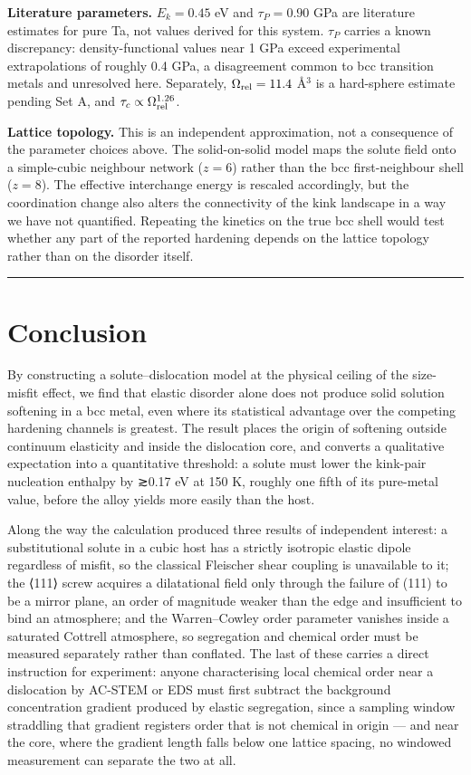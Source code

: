 \textbf{Literature parameters.} \(E_k = 0.45\) eV and \(\tau_P = 0.90\) GPa are literature estimates for pure Ta, not values derived for this system. \(\tau_P\) carries a known discrepancy: density-functional values near 1 GPa exceed experimental extrapolations of roughly 0.4 GPa, a disagreement common to bcc transition metals and unresolved here. Separately, \(\Omega_{\rm rel} = 11.4\) \AA\(^3\) is a hard-sphere estimate pending Set A, and \(\tau_c \propto \Omega_{\rm rel}^{1.26}\).

\textbf{Lattice topology.} This is an independent approximation, not a consequence of the parameter choices above. The solid-on-solid model maps the solute field onto a simple-cubic neighbour network (\(z=6\)) rather than the bcc first-neighbour shell (\(z=8\)). The effective interchange energy is rescaled accordingly, but the coordination change also alters the connectivity of the kink landscape in a way we have not quantified. Repeating the kinetics on the true bcc shell would test whether any part of the reported hardening depends on the lattice topology rather than on the disorder itself.

\begin{center}\rule{0.5\linewidth}{0.5pt}\end{center}

\hypertarget{conclusion}{%
\section{Conclusion}\label{sec:conclusion}}

By constructing a solute--dislocation model at the physical ceiling of the size-misfit effect, we find that elastic disorder alone does not produce solid solution softening in a bcc metal, even where its statistical advantage over the competing hardening channels is greatest. The result places the origin of softening outside continuum elasticity and inside the dislocation core, and converts a qualitative expectation into a quantitative threshold: a solute must lower the kink-pair nucleation enthalpy by ≳0.17 eV at 150 K, roughly one fifth of its pure-metal value, before the alloy yields more easily than the host.

Along the way the calculation produced three results of independent interest: a substitutional solute in a cubic host has a strictly isotropic elastic dipole regardless of misfit, so the classical Fleischer shear coupling is unavailable to it; the ⟨111⟩ screw acquires a dilatational field only through the failure of (111) to be a mirror plane, an order of magnitude weaker than the edge and insufficient to bind an atmosphere; and the Warren--Cowley order parameter vanishes inside a saturated Cottrell atmosphere, so segregation and chemical order must be measured separately rather than conflated. The last of these carries a direct instruction for experiment: anyone characterising local chemical order near a dislocation by AC-STEM or EDS must first subtract the background concentration gradient produced by elastic segregation, since a sampling window straddling that gradient registers order that is not chemical in origin --- and near the core, where the gradient length falls below one lattice spacing, no windowed measurement can separate the two at all.

